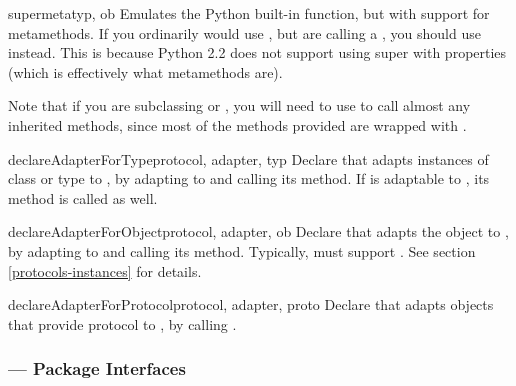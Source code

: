 \begin{verbatim%
}
\begin{verbatim%
}
\begin{verbatim%
}
\begin{verbatim%
}
\begin{verbatim%
}
\begin{verbatim%
}
\begin{funcdesc}{supermeta}{typ, ob}
Emulates the Python built-in  function, but with support for
metamethods.  If you ordinarily would use , but are calling a
, you should use  instead.  This is
because Python 2.2 does not support using super with properties (which is
effectively what metamethods are).

Note that if you are subclassing  or , you
will need to use  to call almost any inherited methods,
since most of the methods provided are wrapped with .
\end{funcdesc}

\begin{funcdesc}{declareAdapterForType}{protocol, adapter, typ }
Declare that  adapts instances of class or type 
to , by adapting  to  and
calling its  method.  If  is adaptable
to , its  method is
called as well.
\end{funcdesc}


\begin{funcdesc}{declareAdapterForObject}{protocol, adapter, ob }
Declare that  adapts the object  to , by
adapting  to  and calling its
 method.  Typically,  must support
.  See section \ref{protocols-instances} for details.
\end{funcdesc}


\begin{funcdesc}{declareAdapterForProtocol}{protocol, adapter, proto }
Declare that  adapts objects that provide protocol 
to , by calling
.

\end{funcdesc}














\newpage
\subsubsection{ --- Package Interfaces\label{protocols-interfaces-module}}


\end{verbatim%
}
\end{verbatim%
}
\end{verbatim%
}
\end{verbatim%
}
\end{verbatim%
}
\end{verbatim%
}
